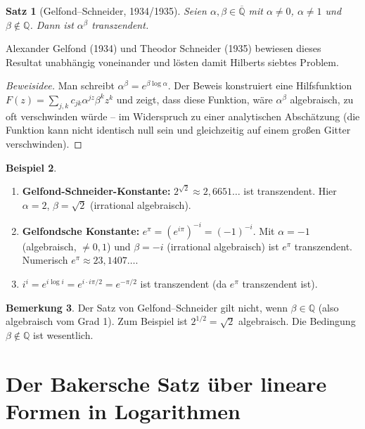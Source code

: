 \documentclass[12pt,a4paper]{amsart}
\newtheorem{theorem}{Satz}[section]
\theoremstyle{definition}
\newtheorem{beispiel}[theorem]{Beispiel}
\newtheorem{bemerkung}[theorem]{Bemerkung}
\begin{document}
\begin{theorem}[Gelfond--Schneider, 1934/1935]
\label{satz:gelfond-schneider}
Seien $\alpha, \beta \in \overline{\mathbb{Q}}$ mit $\alpha \neq 0$, $\alpha
\neq 1$ und $\beta \notin \mathbb{Q}$. Dann ist $\alpha^\beta$ transzendent.
\end{theorem}

Alexander Gelfond (1934) und Theodor Schneider (1935) bewiesen dieses Resultat
unabhängig voneinander und lösten damit Hilberts siebtes Problem.

\begin{proof}[Beweisidee]
Man schreibt $\alpha^\beta = e^{\beta \log \alpha}$. Der Beweis konstruiert
eine Hilfsfunktion $F(z) = \sum_{j,k} c_{jk} \alpha^{jz} \beta^k z^k$
und zeigt, dass diese Funktion, wäre $\alpha^\beta$ algebraisch, zu oft
verschwinden würde -- im Widerspruch zu einer analytischen Abschätzung
(die Funktion kann nicht identisch null sein und gleichzeitig auf einem
großen Gitter verschwinden).
\end{proof}

\begin{beispiel}
\begin{enumerate}[label=(\roman*)]
  \item \textbf{Gelfond-Schneider-Konstante:} $2^{\sqrt{2}} \approx 2{,}6651\ldots$
        ist transzendent. Hier $\alpha = 2$, $\beta = \sqrt{2}$ (irrational algebraisch).
  \item \textbf{Gelfondsche Konstante:} $e^\pi = (e^{i\pi})^{-i} = (-1)^{-i}$.
        Mit $\alpha = -1$ (algebraisch, $\neq 0,1$) und $\beta = -i$
        (irrational algebraisch) ist $e^\pi$ transzendent.
        Numerisch $e^\pi \approx 23{,}1407\ldots$.
  \item $i^i = e^{i \log i} = e^{i \cdot i\pi/2} = e^{-\pi/2}$ ist transzendent
        (da $e^\pi$ transzendent ist).
\end{enumerate}
\end{beispiel}

\begin{bemerkung}
Der Satz von Gelfond--Schneider gilt nicht, wenn $\beta \in \mathbb{Q}$ (also
algebraisch vom Grad 1). Zum Beispiel ist $2^{1/2} = \sqrt{2}$ algebraisch.
Die Bedingung $\beta \notin \mathbb{Q}$ ist wesentlich.
\end{bemerkung}


\section{Der Bakersche Satz über lineare Formen in Logarithmen}
\label{sec:baker}
\end{document}
